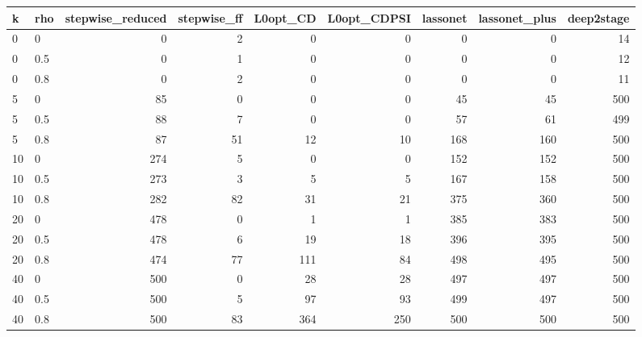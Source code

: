 \begin{tabular}{llrrrrrrr}
\toprule
k & rho & stepwise\_reduced & stepwise\_ff & L0opt\_CD & L0opt\_CDPSI & lassonet & lassonet\_plus & deep2stage \\
\midrule
0 & 0 & 0 & 2 & 0 & 0 & 0 & 0 & 14 \\
0 & 0.5 & 0 & 1 & 0 & 0 & 0 & 0 & 12 \\
0 & 0.8 & 0 & 2 & 0 & 0 & 0 & 0 & 11 \\
5 & 0 & 85 & 0 & 0 & 0 & 45 & 45 & 500 \\
5 & 0.5 & 88 & 7 & 0 & 0 & 57 & 61 & 499 \\
5 & 0.8 & 87 & 51 & 12 & 10 & 168 & 160 & 500 \\
10 & 0 & 274 & 5 & 0 & 0 & 152 & 152 & 500 \\
10 & 0.5 & 273 & 3 & 5 & 5 & 167 & 158 & 500 \\
10 & 0.8 & 282 & 82 & 31 & 21 & 375 & 360 & 500 \\
20 & 0 & 478 & 0 & 1 & 1 & 385 & 383 & 500 \\
20 & 0.5 & 478 & 6 & 19 & 18 & 396 & 395 & 500 \\
20 & 0.8 & 474 & 77 & 111 & 84 & 498 & 495 & 500 \\
40 & 0 & 500 & 0 & 28 & 28 & 497 & 497 & 500 \\
40 & 0.5 & 500 & 5 & 97 & 93 & 499 & 497 & 500 \\
40 & 0.8 & 500 & 83 & 364 & 250 & 500 & 500 & 500 \\
\bottomrule
\end{tabular}
